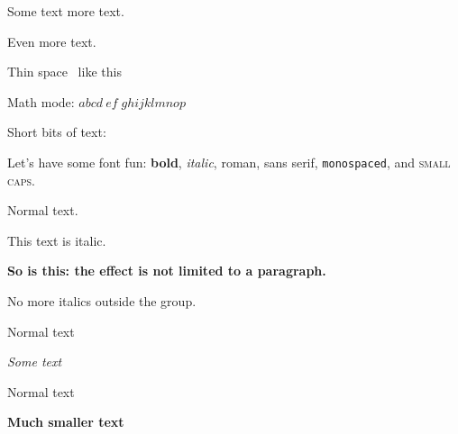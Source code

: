 \documentclass{article}
\begin{document}
Some text \hspace{1cm} more text.

\vspace{10cm}

Even more text.

Thin space \, like this

Math mode:
$ab cd \: ef \; ghijk \! lmnop$

Short bits of text:

Let's have some font fun: \textbf{bold}, \textit{italic}, \textrm{roman},
\textsf{sans serif}, \texttt{monospaced}, and \textsc{small caps}.


Normal text.

{\itshape

This text is italic.

\bfseries
So is this: the effect is not limited to a paragraph.

}

No more italics outside the group.

Normal text
\begin{center}
{\itshape\large Some text\par} %
Normal text
{\bfseries\small Much smaller text\par}
\end{center}
\end{document}
